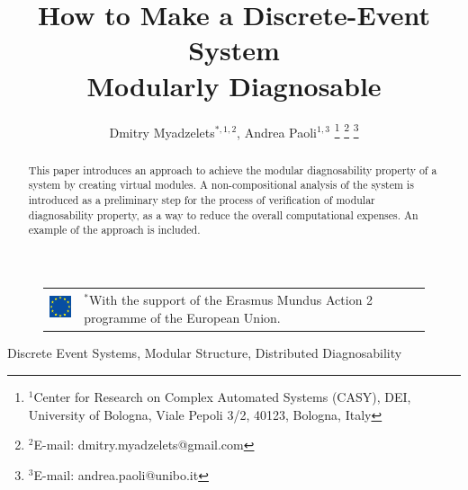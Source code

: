 \documentclass[a4paper, 10pt, conference]{ieeeconf}
\begin{document}
\title{How to Make a Discrete-Event System \\ Modularly Diagnosable}
\author{Dmitry Myadzelets$^{*,1,2}$, Andrea Paoli$^{1,3}$%
\thanks{$^{1}$Center for Research on Complex Automated Systems (CASY), DEI,
University of Bologna, Viale Pepoli 3/2, 40123, Bologna, Italy}
	\thanks{$^{2}$E-mail: {dmitry.myadzelets@gmail.com}}
	\thanks{$^{3}$E-mail: {andrea.paoli@unibo.it}}
}
\maketitle

\begin{figure}[!b]
\begin{tabular}{l p{60mm}}
 	\includegraphics[height=10mm]{EU_flag.eps}
 	& \vspace{-10mm} \footnotesize
 	$^{*}$With the support of the Erasmus Mundus Action 2 programme of the
 	European Union.
\end{tabular}
\end{figure}

\begin{abstract}
This paper introduces an approach to achieve the modular diagnosability property
of a system by creating virtual modules. A non-compositional analysis of the
system is introduced as a preliminary step for the process of verification of
modular diagnosability property, as a way to reduce the overall computational
expenses. An example of the approach is included.
\end{abstract}

\begin{keywords}
Discrete Event Systems, Modular Structure, Distributed Diagnosability
\end{keywords}

\newtheorem{assumption}{Assumption}
\newtheorem{definition}{Definition}
\newtheorem{conjecture}{Conjecture}
\newtheorem{lemma}{Lemma}
\newtheorem{corollary}{Corollary}
\newtheorem{example}{Example}
\newtheorem{theorem}{Theorem}
\end{document}
